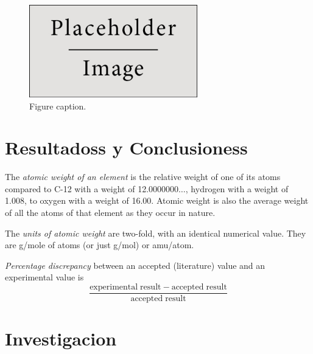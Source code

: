 \documentclass{article}
\begin{document}
\begin{figure}[h]
\begin{center}
\includegraphics[width=0.65\textwidth]{placeholder} %
\caption{Figure caption.}
\end{center}
\end{figure}
\section{Resultadoss y Conclusioness}
\begin{enumerate}
\begin{item}
The \emph{atomic weight of an element} is the relative weight of one of its atoms compared to C-12 with a weight of 12.0000000$\ldots$, hydrogen with a weight of 1.008, to oxygen with a weight of 16.00. Atomic weight is also the average weight of all the atoms of that element as they occur in nature.
\end{item}
\begin{item}
The \emph{units of atomic weight} are two-fold, with an identical numerical value. They are g/mole of atoms (or just g/mol) or amu/atom.
\end{item}
\begin{item}
\emph{Percentage discrepancy} between an accepted (literature) value and an experimental value is
\begin{equation*}
\frac{\mathrm{experimental\;result} - \mathrm{accepted\;result}}{\mathrm{accepted\;result}}
\end{equation*}
\end{item}
\end{enumerate}
\section{Investigacion}


\end{document}

